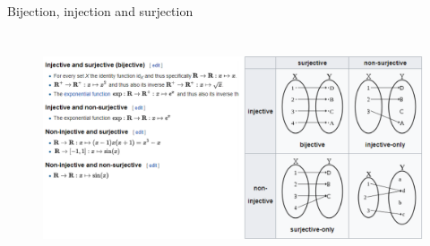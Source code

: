 \documentclass[aspectratio=169]{beamer}
\begin{document}
\begin{frame}[t]{Bijection, injection and surjection}
\framesubtitle{}
    \vspace{-0.6cm}
    \begin{figure}[H]
        \centering\includegraphics[height=6.5cm,width=1\textwidth,keepaspectratio]{bij_inj_surj_full.png}
        \label{fig:bij_inj_surj_full.png}
    \end{figure}
\end{frame}




\end{document}
